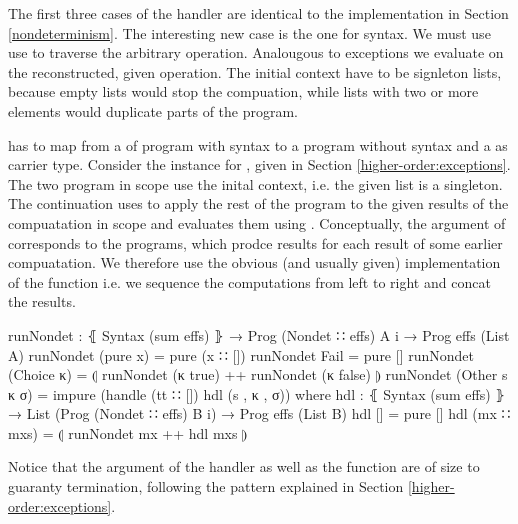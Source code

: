 The first three cases of the handler are identical to the implementation in
Section \ref{nondeterminism}.
The interesting new case is the one for  syntax.
We must use use  to traverse the arbitrary operation.
Analougous to exceptions we evaluate  on the reconstructed,
given operation.
The initial context have to be signleton lists, because empty lists would
stop the compuation, while lists with two or more elements would duplicate
parts of the program.

 has to map from a  of program with
 syntax to a program without 
syntax and a  as carrier type.
Consider the  instance for , given in
Section \ref{higher-order:exceptions}.
The two program in scope use the inital context, i.e. the given list is a
singleton.
The continuation uses \AgdaFunction{<\$>} to apply the rest of the program to
the given results of the compuatation in scope and evaluates them using
.
Conceptually, the argument of  corresponds to the
programs, which prodce results for each result of some earlier compuatation.
We therefore use the obvious (and usually given) implementation of the
 function i.e. we sequence the computations from left to right
and concat the results.

\begin{code}
runNondet : ⦃ Syntax (sum effs) ⦄ → Prog (Nondet ∷ effs) A {i} → Prog effs (List A)
runNondet (pure x)       = pure (x ∷ [])
runNondet Fail           = pure []
runNondet (Choice κ)     = ⦇ runNondet (κ true) ++ runNondet (κ false) ⦈
runNondet (Other s κ σ)  = impure (handle (tt ∷ []) hdl (s , κ , σ))
  where  hdl : ⦃ Syntax (sum effs) ⦄ →
           List (Prog (Nondet ∷ effs) B {i}) → Prog effs (List B)
         hdl []          = pure []
         hdl (mx ∷ mxs)  = ⦇ runNondet mx ++ hdl mxs ⦈
\end{code}
Notice that the argument of the handler as well as the 
function are of size  to guaranty termination, following the
pattern explained in Section \ref{higher-order:exceptions}.


